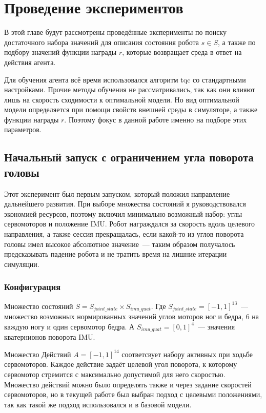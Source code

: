 \chapter{Проведение экспериментов}\label{ch:ch4}
В этой главе будут рассмотрены проведённые эксперименты по поиску достаточного набора значений для описания состояния робота $s \in S$, а также по подбору значений функции награды $r$, которые возвращает среда в ответ на действия агента. 

Для обучения агента всё время использовался алгоритм tqc \cite{kuznetsov2020controlling} со стандартными настройками. Прочие методы обучения не рассматривались, так как они влияют лишь на скорость сходимости к оптимальной модели. Но вид оптимальной модели определяется при помощи свойств внешней среды в симуляторе, а также функции награды $r$. Поэтому фокус в данной работе именно на подборе этих параметров.

\section{Начальный запуск с ограничением угла поворота головы}\label{sec:ch1/sec5}
Этот эксперимент был первым запуском, который положил направление дальнейшего развития. При выборе множества состояний я руководствовался экономией ресурсов, поэтому включил минимально возможный набор: углы сервомоторов и положение IMU. Робот награждался за скорость вдоль целевого направления, а также сессия прекращалась, если какой-то из углов поворота головы имел высокое абсолютное значение~--- таким образом получалось предсказывать падение робота и не тратить время на лишние итерации симуляции.
\subsection{Конфигурация}\label{sec:ch1.1/sec5}

Множество состояний $S = S_{joint\_state} \times S_{imu\_quat}$. Где $S_{joint\_state} = [-1, 1]^{13}$~--- множество возможных нормированных значений углов моторов ног и бедра, 6 на каждую ногу и один сервомотор бедра. А $S_{imu\_quat} = [0, 1]^4$~--- значения кватернионов поворота IMU.

Множество Действий $A = [-1, 1]^{14}$ соответсвует набору активных при ходьбе сервомоторов. Каждое действие задаёт целевой угол поворота, к которому сервомотор стремится с максимально допустимой для него скоростью. Множество действий можно было определять также и через задание скоростей сервомоторов, но в текущей работе был выбран подход с целевыми положениями, так как такой же подход использовался и в базовой модели. 

